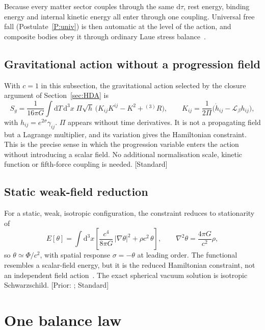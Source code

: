 \documentclass[11pt]{article}
\newcommand{\Pg}{\Pi}                 %
\newcommand{\thP}{\theta}             %
\newcommand{\sgP}{\sigma}             %
\newcommand{\dd}{\mathrm{d}}
\newcommand{\Tref}{T}                 %
\newcommand{\st}[1]{\textsf{\small[#1]}}
\theoremstyle{plain}
\theoremstyle{definition}
\theoremstyle{remark}
\begin{document}
Because every matter sector couples through the same $\dd\tau$, rest energy, binding energy and internal kinetic energy all enter through one coupling. Universal free fall (Postulate~\ref{P:univ}) is then automatic at the level of the action, and composite bodies obey it through ordinary Laue stress balance~\cite{JordanGeometry}.

\subsection{Gravitational action without a progression field}

With $c=1$ in this subsection, the gravitational action selected by the closure argument of Section~\ref{sec:HDA} is
\begin{equation}
S_g = \frac{1}{16\pi G}\int \dd\Tref\,\dd^3x\;\Pg\sqrt{h}\,\Big(K_{ij}K^{ij}-K^2+{}^{(3)}\!R\Big),
\qquad
K_{ij}=\frac{1}{2\Pg}\big(\dot h_{ij}-\mathcal L_\beta h_{ij}\big),
\label{eq:ADM}
\end{equation}
with $h_{ij}=e^{2\sgP}\gamma_{ij}$. $\Pg$ appears without time derivatives. It is not a propagating field but a Lagrange multiplier, and its variation gives the Hamiltonian constraint. This is the precise sense in which the progression variable enters the action without introducing a scalar field. No additional normalisation scale, kinetic function or fifth-force coupling is needed. \st{Standard}

\subsection{Static weak-field reduction}

For a static, weak, isotropic configuration, the constraint reduces to stationarity of
\begin{equation}
E[\thP] = \int \dd^3x\left[\frac{c^4}{8\pi G}\,|\nabla\thP|^2 + \rho c^2\,\thP\right],
\qquad
\nabla^2\thP = \frac{4\pi G}{c^2}\rho,
\label{eq:Poisson}
\end{equation}
so $\thP\simeq\Phi/c^2$, with spatial response $\sgP=-\thP$ at leading order. The functional resembles a scalar-field energy, but it is the reduced Hamiltonian constraint, not an independent field action~\cite{JordanHDA}. The exact spherical vacuum solution is isotropic Schwarzschild. \st{Prior: \cite{JordanHDA}; Standard}

\section{One balance law}
\label{sec:balance}
\end{document}
